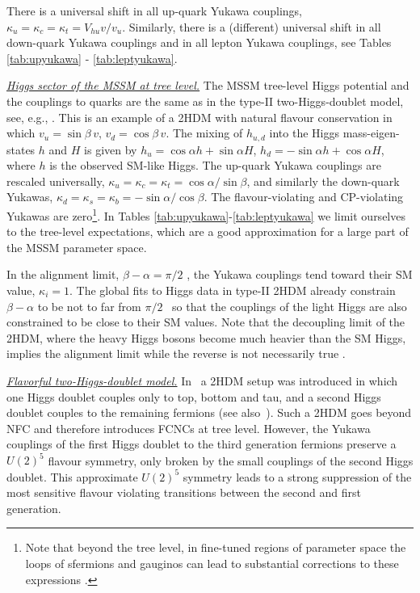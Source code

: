 \documentclass[../report.tex]{subfiles}
\begin{document}
There is a universal shift in all up-quark Yukawa couplings, $\kappa_u = \kappa_c = \kappa_t = V_{hu}{v}/{v_u}$. Similarly, there is a (different) universal shift in all down-quark Yukawa couplings and in all lepton Yukawa couplings, see Tables \ref{tab:upyukawa} - \ref{tab:leptyukawa}.

\underline{\it Higgs sector of the MSSM at tree level.}
The MSSM tree-level Higgs potential and the couplings to quarks are
the same as in the type-II two-Higgs-doublet model, see, e.g.,
\cite{Haber:1984rc}. This is an example of a 2HDM with natural flavour
conservation in which $v_u=\sin\beta\, v$, $v_d=\cos\beta\,
v$. The mixing of $h_{u,d}$ into the Higgs mass-eigen-states $h$ and
$H$ is given by $h_u=\cos \alpha h+\sin\alpha H$, $h_d = -\sin\alpha h +\cos\alpha H$,
where $h$ is the observed SM-like Higgs. The up-quark Yukawa couplings are rescaled universally, 
$	\kappa_u = \kappa_c = \kappa_t=\cos\alpha/\sin\beta$, and similarly the down-quark Yukawas, 
	$\kappa_d = \kappa_s = \kappa_b = -\sin\alpha/\cos\beta$.
The flavour-violating and CP-violating Yukawas are zero\footnote{Note that beyond the tree level, in fine-tuned regions of parameter space the loops of sfermions and gauginos can lead to substantial corrections to these expressions \cite{Aloni:2015wvn}.}. In Tables \ref{tab:upyukawa}-\ref{tab:leptyukawa} we limit ourselves to the tree-level expectations, which are a good approximation for a large part of the MSSM parameter space.


In the alignment limit, $\beta-\alpha=\pi/2$ \cite{Gunion:2002zf,Carena:2013ooa,Dev:2014yca,Carena:2014nza,Dev:2015bta,Haber:2015pua,Carena:2015moc}, the Yukawa couplings tend toward their
SM value, $\kappa_i=1$.  The global fits to Higgs data in type-II 2HDM
already constrain $\beta-\alpha$ to be not to far from $\pi/2$~\cite{Carmi:2012in,
  Falkowski:2013dza, Grinstein:2013npa} so that the couplings of the light Higgs are also constrained to be close to their SM values. 
  Note that the decoupling limit of the 2HDM, where the heavy Higgs bosons become much heavier than the SM Higgs, implies the alignment limit while the reverse is not necessarily true \cite{Carena:2013ooa}.

\underline{\it Flavorful two-Higgs-doublet model.}
In~\cite{Altmannshofer:2015esa} a 2HDM setup was introduced in which one Higgs doublet couples only to top, bottom and tau, and a second Higgs doublet couples to the remaining fermions (see also~\cite{Botella:2016krk,Ghosh:2015gpa,Das:1995df,Blechman:2010cs}).
Such a 2HDM goes beyond NFC and therefore introduces FCNCs at tree level. However, the Yukawa couplings
of the first Higgs doublet to the third generation fermions preserve a $U(2)^5$ flavour symmetry, only
broken by the small couplings of the second Higgs doublet. This approximate $U(2)^5$ symmetry
leads to a strong suppression of the most sensitive flavour violating transitions between the second and first generation.
\end{document}

